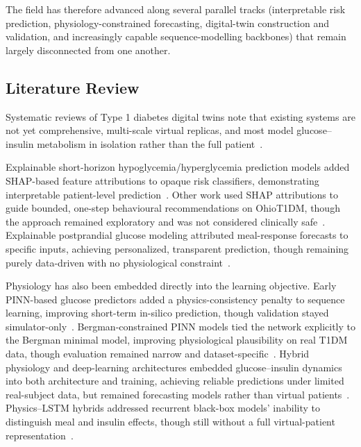 \documentclass[journal]{IEEEtran}
\begin{document}
The field has therefore advanced along several parallel tracks (interpretable risk prediction, physiology-constrained forecasting, digital-twin construction and validation, and increasingly capable sequence-modelling backbones) that remain largely disconnected from one another.

\subsection{Literature Review}

Systematic reviews of Type 1 diabetes digital twins note that existing systems are not yet comprehensive, multi-scale virtual replicas, and most model glucose--insulin metabolism in isolation rather than the full patient~\cite{ref2}.

Explainable short-horizon hypoglycemia/hyperglycemia prediction models added SHAP-based feature attributions to opaque risk classifiers, demonstrating interpretable patient-level prediction~\cite{ref3}. Other work used SHAP attributions to guide bounded, one-step behavioural recommendations on OhioT1DM, though the approach remained exploratory and was not considered clinically safe~\cite{ref6}. Explainable postprandial glucose modeling attributed meal-response forecasts to specific inputs, achieving personalized, transparent prediction, though remaining purely data-driven with no physiological constraint~\cite{ref7}.

Physiology has also been embedded directly into the learning objective. Early PINN-based glucose predictors added a physics-consistency penalty to sequence learning, improving short-term in-silico prediction, though validation stayed simulator-only~\cite{ref9}. Bergman-constrained PINN models tied the network explicitly to the Bergman minimal model, improving physiological plausibility on real T1DM data, though evaluation remained narrow and dataset-specific~\cite{ref10}. Hybrid physiology and deep-learning architectures embedded glucose--insulin dynamics into both architecture and training, achieving reliable predictions under limited real-subject data, but remained forecasting models rather than virtual patients~\cite{ref11}. Physics--LSTM hybrids addressed recurrent black-box models' inability to distinguish meal and insulin effects, though still without a full virtual-patient representation~\cite{ref12}.
\end{document}
